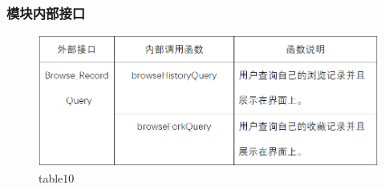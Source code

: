\subsubsection{模块内部接口}
\begin{figure}[!htb]
	\centering
	\includegraphics[scale=1]{image/b10.png} %
	\caption{table10} %
\end{figure}
